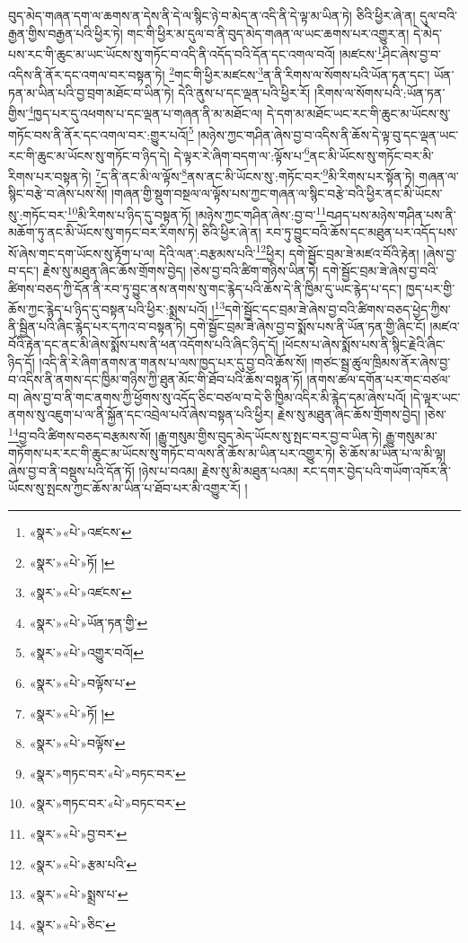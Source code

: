 བུད་མེད་གཞན་དག་ལ་ཆགས་ན་དེས་ནི་དེ་ལ་སྙིང་ཉེ་བ་མེད་ན་འདི་ནི་དེ་ལྟ་མ་ཡིན་ཏེ། ཅིའི་ཕྱིར་ཞེ་ན། དུལ་བའི་རྒྱན་གྱིས་བརྒྱན་པའི་ཕྱིར་ཏེ། གང་གི་ཕྱིར་མ་དུལ་བ་ནི་བུད་མེད་གཞན་ལ་ཡང་ཆགས་པར་འགྱུར་ན། དེ་མེད་པས་རང་གི་ཆུང་མ་ཡང་ཡོངས་སུ་གཏོང་བ་འདི་ནི་འདོད་བའི་དོན་དང་འགལ་བའོ། །མཛངས་\footnote{«སྣར་»«པེ་»འཛངས་}ཤིང་ཞེས་བྱ་བ་འདིས་ནི་ནོར་དང་འགལ་བར་བསྟན་ཏེ། \footnote{«སྣར་»«པེ་»ཏོ། ། }གང་གི་ཕྱིར་མཛངས་\footnote{«སྣར་»«པེ་»འཛངས་}ན་ནི་རིགས་ལ་སོགས་པའི་ཡོན་ཏན་དང་། ཡོན་ཏན་མ་ཡིན་པའི་བྱ་བྲག་མཐོང་བ་ཡིན་ཏེ། དེའི་ནུས་པ་དང་ལྡན་པའི་ཕྱིར་རོ། །རིགས་ལ་སོགས་པའི་:ཡོན་ཏན་གྱིས་\footnote{«སྣར་»«པེ་»ཡོན་ཏན་གྱི་}ཁྱད་པར་དུ་འཕགས་པ་དང་ལྡན་པ་གཞན་ནི་མ་མཐོང་ལ། དེ་དག་མ་མཐོང་ཡང་རང་གི་ཆུང་མ་ཡོངས་སུ་གཏོང་བས་ནི་ནོར་དང་འགལ་བར་:གྱུར་པའོ།\footnote{«སྣར་»«པེ་»འགྱུར་བའོ།} །མཉེས་ཀྱང་གཤིན་ཞེས་བྱ་བ་འདིས་ནི་ཆོས་དེ་ལྟ་བུ་དང་ལྡན་ཡང་རང་གི་ཆུང་མ་ཡོངས་སུ་གཏོང་བ་ཉིད་དེ། དེ་ལྟར་རེ་ཞིག་བདག་ལ་:ལྟོས་པ་\footnote{«སྣར་»«པེ་»བལྟོས་པ་}ནང་མི་ཡོངས་སུ་གཏོང་བར་མི་རིགས་པར་བསྟན་ཏེ། \footnote{«སྣར་»«པེ་»ཏོ། ། }ད་ནི་ནང་མི་ལ་ལྟོས་\footnote{«སྣར་»«པེ་»བལྟོས་}ནས་ནང་མི་ཡོངས་སུ་:གཏོང་བར་\footnote{«སྣར་»གཏང་བར་«པེ་»བཏང་བར་}མི་རིགས་པར་སྟོན་ཏེ། གཞན་ལ་སྙིང་བརྩེ་བ་ཞེས་པས་སོ། །གཞན་གྱི་སྡུག་བསྔལ་ལ་ལྟོས་པས་ཀྱང་གཞན་ལ་སྙིང་བརྩེ་བའི་ཕྱིར་ནང་མི་ཡོངས་སུ་:གཏོང་བར་\footnote{«སྣར་»གཏང་བར་«པེ་»བཏང་བར་}མི་རིགས་པ་ཉིད་དུ་བསྟན་ཏོ། །མཉེས་ཀྱང་གཤིན་ཞེས་:བྱ་བ་\footnote{«སྣར་»«པེ་»བྱ་བར་}བཤད་པས་མཉེས་གཤིན་པས་ནི་མཆོག་ཏུ་ནང་མི་ཡོངས་སུ་གཏང་བར་རིགས་ཏེ། ཅིའི་ཕྱིར་ཞེ་ན། རབ་ཏུ་བྱུང་བའི་ཆོས་དང་མཐུན་པར་འདོད་པས་སོ་ཞེས་གང་དག་ཡོངས་སུ་རྟོག་པ་ལ། དེའི་ལན་:བརྩམས་པའི་\footnote{«སྣར་»«པེ་»རྩམ་པའི་}ཕྱིར། དགེ་སྦྱོང་བྲམ་ཟེ་མཛའ་བོའི་རྟེན། །ཞེས་བྱ་བ་དང་། རྗེས་སུ་མཐུན་ཞིང་ཆོས་གྲོགས་བྱེད། །ཅེས་བྱ་བའི་ཚིག་གཉིས་ཡིན་ཏེ། དགེ་སྦྱོང་བྲམ་ཟེ་ཞེས་བྱ་བའི་ཚིགས་བཅད་ཀྱི་དོན་ནི་རབ་ཏུ་བྱུང་ནས་ནགས་སུ་གང་རྙེད་པའི་ཆོས་དེ་ནི་ཁྱིམ་དུ་ཡང་རྙེད་པ་དང་། ཁྱད་པར་གྱི་ཆོས་ཀྱང་རྙེད་པ་ཉིད་དུ་བསྟན་པའི་ཕྱིར་:སྨྲས་པའོ། །\footnote{«སྣར་»«པེ་»སྨྲས་པ་}དགེ་སྦྱོང་དང་བྲམ་ཟེ་ཞེས་བྱ་བའི་ཚིགས་བཅད་ཕྱེད་ཀྱིས་ནི་སྦྱིན་པའི་ཞིང་རྙེད་པར་དཀའ་བ་བསྟན་ཏེ། དགེ་སྦྱོང་བྲམ་ཟེ་ཞེས་བྱ་བ་སྨོས་པས་ནི་ཡོན་ཏན་གྱི་ཞིང་ངོ། །མཛའ་བོའི་རྟེན་དང་ནང་མི་ཞེས་སྨོས་པས་ནི་ཕན་འདོགས་པའི་ཞིང་ཉིད་དོ། །ཕོངས་པ་ཞེས་སྨོས་པས་ནི་སྙིང་རྗེའི་ཞིང་ཉིད་དོ། །འདི་ནི་རེ་ཞིག་ནགས་ན་གནས་པ་ལས་ཁྱད་པར་དུ་བྱ་བའི་ཆོས་སོ། །གཙང་སྦྲ་ཚུལ་ཁྲིམས་ནོར་ཞེས་བྱ་བ་འདིས་ནི་ནགས་དང་ཁྱིམ་གཉིས་ཀྱི་ཐུན་མོང་གི་ཐོབ་པའི་ཆོས་བསྟན་ཏོ། །ནགས་ཚལ་དགོན་པར་གང་བཙལ་བ། ཞེས་བྱ་བ་ནི་གང་ནགས་ཀྱི་ཕྱོགས་སུ་འདོད་ཅིང་བཙལ་བ་དེ་ཅི་ཁྱིམ་འདིར་མི་རྙེད་དམ་ཞེས་པའོ། །དེ་ལྟར་ཡང་ནགས་སུ་འཇུག་པ་ལ་ནི་སྐྱོན་དང་འབྲེལ་པའོ་ཞེས་བསྟན་པའི་ཕྱིར། རྗེས་སུ་མཐུན་ཞིང་ཆོས་གྲོགས་བྱེད། །ཅེས་\footnote{«སྣར་»«པེ་»ཅིང་}བྱ་བའི་ཚིགས་བཅད་བརྩམས་སོ། །རྒྱུ་གསུམ་གྱིས་བུད་མེད་ཡོངས་སུ་སྤང་བར་བྱ་བ་ཡིན་ཏེ། རྒྱུ་གསུམ་མ་གཏོགས་པར་རང་གི་ཆུང་མ་ཡོངས་སུ་གཏོང་བ་ལས་ནི་ཆོས་མ་ཡིན་པར་འགྱུར་ཏེ། ཅི་ཆོས་མ་ཡིན་པ་ལ་མི་ལྟ། ཞེས་བྱ་བ་ནི་བསྡུས་པའི་དོན་ཏོ། །ཉེས་པ་བའམ། རྗེས་སུ་མི་མཐུན་པའམ། རང་དགར་བྱེད་པའི་གཡོག་འཁོར་ནི་ཡོངས་སུ་སྤངས་ཀྱང་ཆོས་མ་ཡིན་པ་ཐོབ་པར་མི་འགྱུར་རོ། །
